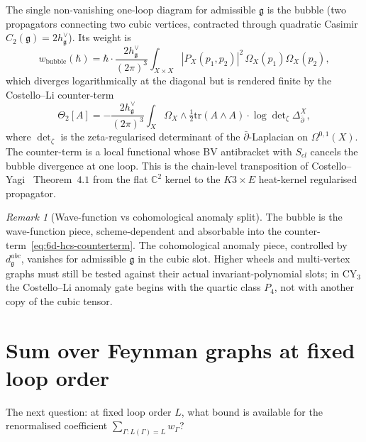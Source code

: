 \documentclass[11pt]{article}
\providecommand{\frakg}{\mathfrak{g}}
\providecommand{\dbar}{\bar{\partial}}
\providecommand{\C}{\mathbb{C}}
\theoremstyle{definition}\newtheorem{definition}[theorem]{Definition}
\theoremstyle{remark}\newtheorem{remark}[theorem]{Remark}\newtheorem{example}[theorem]{Example}
\begin{document}
The single non-vanishing one-loop diagram for admissible $\frakg$ is
the bubble (two propagators connecting two cubic vertices, contracted
through quadratic Casimir $C_2(\frakg) = 2h^\vee_\frakg$). Its weight
is
\begin{equation}
\label{eq:bubble-weight}
w_{\text{bubble}}(\hbar)
= \hbar\cdot \frac{2h^\vee_\frakg}{(2\pi)^3}\int_{X\times X}|P_X(p_1,p_2)|^2\,\Omega_X(p_1)\Omega_X(p_2),
\end{equation}
which diverges logarithmically at the diagonal but is rendered finite
by the Costello--Li counter-term
\begin{equation}
\label{eq:6d-hcs-counterterm}
\Theta_2[A] = -\frac{2h^\vee_\frakg}{(2\pi)^3}\int_X\Omega_X\wedge\tfrac12\mathrm{tr}(A\wedge A)\cdot\log\det\nolimits_\zeta\Delta_{\dbar}^X,
\end{equation}
where $\det_\zeta$ is the zeta-regularised determinant of the
$\dbar$-Laplacian on $\Omega^{0,1}(X)$. The counter-term is a local
functional whose BV antibracket with $S_{cl}$ cancels the bubble
divergence at one loop. This is the chain-level transposition of
Costello--Yagi~\cite{CostelloYagi2018} Theorem~$4.1$ from the flat
$\C^2$ kernel to the $K3\times E$ heat-kernel regularised propagator.

\begin{remark}[Wave-function vs cohomological anomaly split]
The bubble is the wave-function piece, scheme-dependent and absorbable
into the counter-term~\eqref{eq:6d-hcs-counterterm}. The cohomological
anomaly piece, controlled by $d^{abc}_\frakg$, vanishes for admissible
$\frakg$ in the cubic slot. Higher wheels and multi-vertex graphs must
still be tested against their actual invariant-polynomial slots; in
CY$_3$ the Costello--Li anomaly gate begins with the quartic class
$P_4$, not with another copy of the cubic tensor.
\end{remark}

\section{Sum over Feynman graphs at fixed loop order}
\label{sec:sum-graphs-fixed-loop}

The next question: at fixed loop order $L$, what bound is available for
the renormalised coefficient
$\sum_{\Gamma : L(\Gamma) = L} w_\Gamma$?
\end{document}

